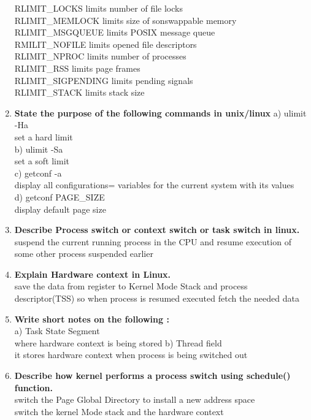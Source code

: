 \documentclass[a4paper,12pt]{article}
\begin{document}
\begin{flushleft}
\begin{enumerate}
{RLIMIT\_LOCKS limits number of file locks\\
RLIMIT\_MEMLOCK limits size of sonswappable memory\\
RLIMIT\_MSGQUEUE limits POSIX message queue\\
RMILIT\_NOFILE limits opened file descriptors\\
RLIMIT\_NPROC limits number of processes\\
RLIMIT\_RSS limits page frames\\
RLIMIT\_SIGPENDING limits pending signals\\
RLIMIT\_STACK limits stack size\\}
\item \textbf{ State the purpose of the following commands in unix/linux}
a) ulimit -Ha\\
{\color{red} set a hard limit}\\
 b) ulimit -Sa\\
{\color{red} set a soft limit} 
\\c) getconf -a\\
{\color{red} display all configurations= variables for the current system with its values}
\\ d) getconf PAGE\_SIZE\\
{\color{red} display default page size}
\item \textbf{ Describe Process switch or context switch or task switch in linux.\\}
{\color{red}suspend the current running process in the CPU and resume execution of some other process suspended earlier}
\item \textbf{ Explain Hardware context in Linux.\\}
{\color{red}save the data from register to Kernel Mode Stack and process descriptor(TSS) so when process is resumed executed fetch the needed data }
\item \textbf{ Write short notes on the following :\\}
a) Task State Segment\\
{\color{red} where hardware context is being stored}
 b) Thread field\\
 {\color{red} it stores hardware context when process is being switched out }
\item \textbf{ Describe how kernel performs a process switch using schedule() function.}\\
{\color{red} switch the Page Global Directory to install a  new address space\\
switch the kernel Mode stack and the hardware context}

\end{enumerate}
\end{flushleft}
\end{document}
